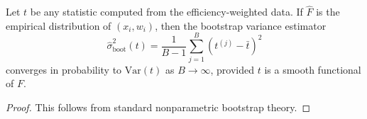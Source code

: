 \documentclass[../../ddppaper3.tex]{subfiles}
\begin{document}
\begin{proposition}
    Let \(t\) be any statistic computed from the efficiency-weighted data. If \(\hat{F}\) is the empirical distribution of \((x_i, w_i)\), then the bootstrap variance estimator
\[
\hat{\sigma}^2_{\mathrm{boot}}(t) = \frac{1}{B-1} \sum_{j=1}^B \left( t^{(j)} - \bar{t} \right)^2
\]
converges in probability to \(\mathrm{Var}(t)\) as \(B \to \infty\), provided \(t\) is a smooth functional of \(F\).
\end{proposition}

\begin{proof}
     This follows from standard nonparametric bootstrap theory.
\end{proof}
\end{document}
